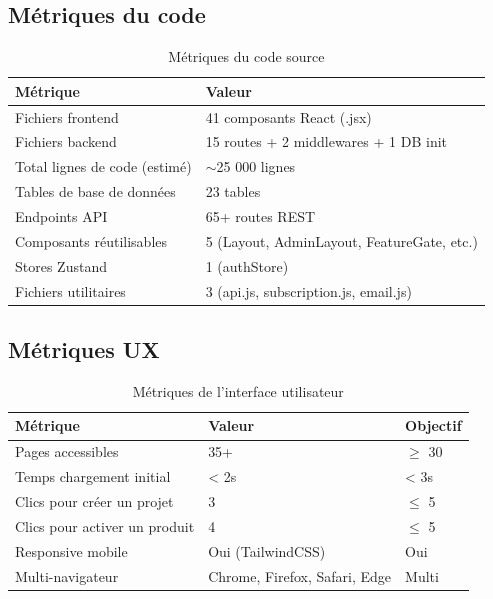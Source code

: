 \subsection{Métriques du code}

\begin{table}[H]
\centering
\caption{Métriques du code source}
\label{tab:code-metrics}
\begin{tabular}{|l|l|}
\hline
\textbf{Métrique} & \textbf{Valeur} \\
\hline
Fichiers frontend & 41 composants React (.jsx) \\
\hline
Fichiers backend & 15 routes + 2 middlewares + 1 DB init \\
\hline
Total lignes de code (estimé) & $\sim$25 000 lignes \\
\hline
Tables de base de données & 23 tables \\
\hline
Endpoints API & 65+ routes REST \\
\hline
Composants réutilisables & 5 (Layout, AdminLayout, FeatureGate, etc.) \\
\hline
Stores Zustand & 1 (authStore) \\
\hline
Fichiers utilitaires & 3 (api.js, subscription.js, email.js) \\
\hline
\end{tabular}
\end{table}

\subsection{Métriques UX}

\begin{table}[H]
\centering
\caption{Métriques de l'interface utilisateur}
\label{tab:ux-metrics}
\begin{tabular}{|l|l|l|}
\hline
\textbf{Métrique} & \textbf{Valeur} & \textbf{Objectif} \\
\hline
Pages accessibles & 35+ & $\geq$ 30 \\
\hline
Temps chargement initial & < 2s & < 3s \\
\hline
Clics pour créer un projet & 3 & $\leq$ 5 \\
\hline
Clics pour activer un produit & 4 & $\leq$ 5 \\
\hline
Responsive mobile & Oui (TailwindCSS) & Oui \\
\hline
Multi-navigateur & Chrome, Firefox, Safari, Edge & Multi \\
\hline
\end{tabular}
\end{table}

